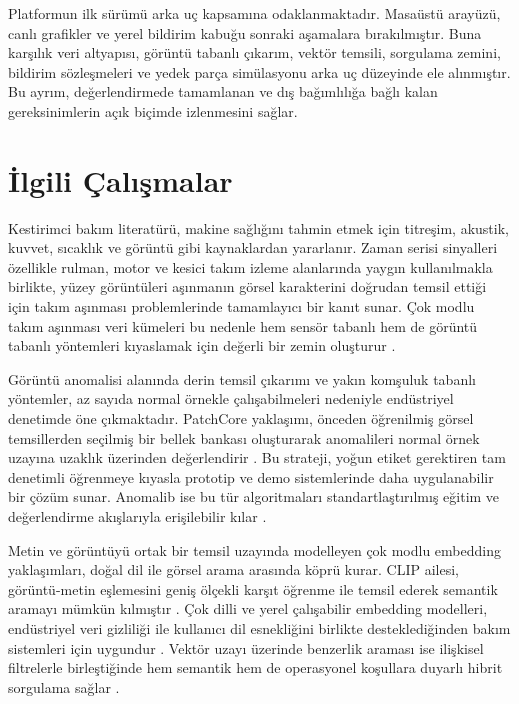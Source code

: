 \documentclass[conference]{IEEEtran}
\begin{document}
Platformun ilk sürümü arka uç kapsamına odaklanmaktadır. Masaüstü arayüzü, canlı grafikler ve yerel bildirim kabuğu sonraki aşamalara bırakılmıştır. Buna karşılık veri altyapısı, görüntü tabanlı çıkarım, vektör temsili, sorgulama zemini, bildirim sözleşmeleri ve yedek parça simülasyonu arka uç düzeyinde ele alınmıştır. Bu ayrım, değerlendirmede tamamlanan ve dış bağımlılığa bağlı kalan gereksinimlerin açık biçimde izlenmesini sağlar.

\section{İlgili Çalışmalar}
Kestirimci bakım literatürü, makine sağlığını tahmin etmek için titreşim, akustik, kuvvet, sıcaklık ve görüntü gibi kaynaklardan yararlanır. Zaman serisi sinyalleri özellikle rulman, motor ve kesici takım izleme alanlarında yaygın kullanılmakla birlikte, yüzey görüntüleri aşınmanın görsel karakterini doğrudan temsil ettiği için takım aşınması problemlerinde tamamlayıcı bir kanıt sunar. Çok modlu takım aşınması veri kümeleri bu nedenle hem sensör tabanlı hem de görüntü tabanlı yöntemleri kıyaslamak için değerli bir zemin oluşturur \cite{matwi2023}.

Görüntü anomalisi alanında derin temsil çıkarımı ve yakın komşuluk tabanlı yöntemler, az sayıda normal örnekle çalışabilmeleri nedeniyle endüstriyel denetimde öne çıkmaktadır. PatchCore yaklaşımı, önceden öğrenilmiş görsel temsillerden seçilmiş bir bellek bankası oluşturarak anomalileri normal örnek uzayına uzaklık üzerinden değerlendirir \cite{patchcore2022}. Bu strateji, yoğun etiket gerektiren tam denetimli öğrenmeye kıyasla prototip ve demo sistemlerinde daha uygulanabilir bir çözüm sunar. Anomalib ise bu tür algoritmaları standartlaştırılmış eğitim ve değerlendirme akışlarıyla erişilebilir kılar \cite{anomalib2024}.

Metin ve görüntüyü ortak bir temsil uzayında modelleyen çok modlu embedding yaklaşımları, doğal dil ile görsel arama arasında köprü kurar. CLIP ailesi, görüntü-metin eşlemesini geniş ölçekli karşıt öğrenme ile temsil ederek semantik aramayı mümkün kılmıştır \cite{clip2021}. Çok dilli ve yerel çalışabilir embedding modelleri, endüstriyel veri gizliliği ile kullanıcı dil esnekliğini birlikte desteklediğinden bakım sistemleri için uygundur \cite{jina2024}. Vektör uzayı üzerinde benzerlik araması ise ilişkisel filtrelerle birleştiğinde hem semantik hem de operasyonel koşullara duyarlı hibrit sorgulama sağlar \cite{pgvector2024}.
\end{document}

